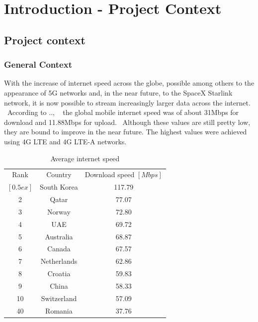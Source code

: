 
\chapter{Introduction - Project Context}
\label{ch:introduction}
\pagestyle{headings}

\section{Project context}
\label{sec:introduction-context}

\subsection{General Context}
\label{subsec:introduction-general-context}
With the increase of internet speed across the globe, possible among others to the appearance of 5G networks and, in
the near future, to the SpaceX Starlink network, it is now possible to stream increasingly larger data across the
internet. \
According to .., \ %
the global mobile internet speed was of about 31Mbps for download and 11.88Mbps for upload. \
Although these values are still pretty low, they are bound to improve in the near future.
The highest values were achieved using 4G LTE and 4G LTE-A networks.

\begin{table}[ht]
    \caption{Average internet speed}
    \centering
    \begin{tabular}{|c|c|c|}
        \hline\hline
        Rank & Country & Download speed $[Mbps]$ \\ $[0.5ex]$
        \hline
        1 & South Korea & 117.79 \\
        2 & Qatar & 77.07  \\
        3 & Norway & 72.80 \\
        4 & UAE & 69.72 \\
        5 & Australia & 68.87 \\
        6 & Canada & 67.57 \\
        7 & Netherlands & 62.86 \\
        8 & Croatia & 59.83 \\
        9 & China & 58.33 \\
        10 & Switzerland & 57.09 \\
        40 & Romania & 37.76
    \end{tabular}
    \label{table:internetSpeed}
\end{table}

